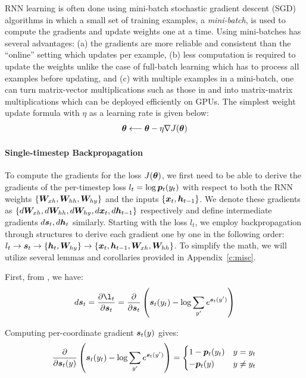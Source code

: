RNN learning is often done using mini-batch stochastic gradient descent (SGD) algorithms in
which a small set of training examples, a {\it mini-batch}, is used to compute
the gradients and update weights one at a time. Using mini-batches has
several advantages: (a) the gradients are more reliable and consistent than the
``online'' setting which updates per example, (b) less computation is required to
update the weights unlike the case of full-batch learning which has to process
all examples before updating, and (c) with multiple examples in a mini-batch,
one can turn matrix-vector multiplications such
as those in  and  into matrix-matrix multiplications which can be
deployed efficiently on GPUs. The simplest weight update formula with $\eta$ as
a learning rate is given below:
\begin{align}
\thetav \longleftarrow \thetav - \eta \grad{J(\thetav)} %
\end{align}

\paragraph{Single-timestep Backpropagation} To compute the gradients for the loss $J(\bm{\theta})$,
we first need to be able to derive the gradients of the per-timestep loss $l_t
=\log \bm{p}_{t}(y_t)$ with respect to both the RNN weights
$\{\bm{W}_{xh}, \bm{W}_{hh}, \bm{W}_{hy}\}$ and the inputs $\{\bm{x}_{t}, \bm{h}_{t-1}\}$. We denote
these gradients as $\{d\bm{W}_{xh}, d\bm{W}_{hh}, d\bm{W}_{hy}, d\bm{x}_{t}, d\bm{h}_{t-1}\}$
respectively and define intermediate gradients $d\bm{s}_{t}, d\bm{h}_{t}$ similarly. 
Starting with the loss $l_t$, we employ backpropagation through structures
\cite{goller:ieeenn00} to derive each gradient one by one in the following
order: $l_t \rightarrow \bm{s}_{t} \rightarrow \{\bm{h}_{t}, \bm{W}_{hy}\} \rightarrow
\{\bm{x}_{t}, \bm{h}_{t-1}, \bm{W}_{xh}, \bm{W}_{hh}\}$. To simplify the math, we will utilize
several lemmas and corollaries provided in Appendix~\ref{c:misc}.

First, from , we have:
\begin{align}
d\s{t} = \fracder{\l_t}{\s{t}} = \parfrac{\s{t}} \paren{\s{t}(y_t) - \log \sum_{y'}
e^{\s{t}(y')}}
\end{align}

Computing per-coordinate gradient $\bm{s}_{t}(y)$ gives:
\begin{align}
 \frac{\partial}{\partial \bm{s}_{t}(y)} \left(\bm{s}_{t}(y_t) - \log \sum_{y'} e^{\bm{s}_{t}(y')}\right) =
  \begin{cases}
   1 - \bm{p}_{t}(y_t) & y = y_t \\
   -\bm{p}_{t}(y) & y \neq y_t
  \end{cases}
\end{align}

